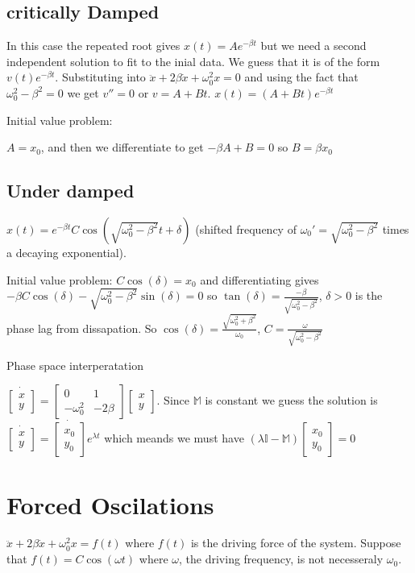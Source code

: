 \documentclass{homework}
\newcommand{\MM}{\mathbb{M}}
\newcommand{\m}[1]{\begin{bmatrix} #1 \end{bmatrix}}
\begin{document}
\subsection{critically Damped}
In this case the repeated root gives $x(t) = Ae^{-\beta t}$ but we need a second independent solution to fit to the inial data. We guess that it is of the form $v(t)e^{-\beta t}$. Substituting into $\ddot x + 2\beta \dot x + \omega_0^2 x = 0$ and using the fact that $\omega_0^2 - \beta^2 = 0$ we get $v'' = 0$ or $v = A + Bt$. 
$x(t) = (A+Bt)e^{-\beta t}$


Initial value problem:

$A = x_0$, and then we differentiate to get $-\beta A + B = 0$ so $B = \beta x_0$

\subsection{Under damped}
$x(t) = e^{-\beta t}C \cos(\sqrt{\omega_0^2 - \beta^2}t + \delta)$ (shifted frequency of $\omega_0'  = \sqrt{\omega_0^2 - \beta^2}$ times a decaying exponential).


Initial value problem: $C\cos(\delta) = x_0$ and differentiating gives $-\beta C \cos (\delta) - \sqrt{\omega_0^2 - \beta^2}\sin (\delta) =0$ so $\tan(\delta) = \frac{-\beta}{\sqrt{\omega_0^2 - \beta^2}}$, $\delta >0$ is the phase lag from dissapation. So $\cos (\delta) = \frac{\sqrt{\omega_0^2 + \beta^2}}{\omega_0}$, $C = \frac{\omega}{\sqrt{\omega_0^2 - \beta^2}}$



Phase space interperatation

$\dot{\m{x \\ y}} = \m{0 & 1 \\ -\omega_0^2 & -2\beta} \m{x \\ y}$. Since $\MM$ is constant we guess the solution is $\dot{\m{x \\ y}} = \dot{\m{x_0 \\ y_0}}e^{\lambda t}$ which meands we must have $(\lambda \mathbb{I} - \mathbb{M})\m{x_0 \\ y_0} = 0$






\section{Forced Oscilations}

$\ddot x + 2\beta \dot x + \omega_0^2 x = f(t)$ where $f(t)$ is the driving force of the system. Suppose that $f(t) = C \cos (\omega t)$ where $\omega$, the driving frequency, is not necesseraly $\omega_0$. 
\end{document}
